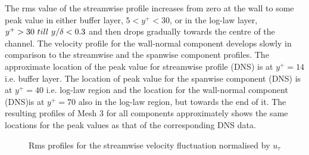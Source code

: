 The rms value of the streamwise profile increases from zero at the wall to some peak value in either buffer layer, $5<y^+< 30$, or in the log-law layer, $y^+ > 30\  till\  y/\delta <0.3$ and then drops gradually towards the centre of the channel. The velocity profile for the wall-normal component develops slowly in comparison to the streamwise and the spanwise component profiles. The approximate location of the peak value for streamwise profile (DNS) is at $y^+ = 14$ \cite{kim:moin:moser:87} i.e. buffer layer. The location of peak value for the spanwise component (DNS) is at $y^+ = 40$ i.e. log-law region and the location for the wall-normal component (DNS)is at $y^+ = 70$ also in the log-law region, but towards the end of it. The resulting profiles of Mesh 3 for all components approximately shows the same locations for the peak values as that of the corresponding DNS data.
%
\begin{figure}[h]
\begin{minipage}[b]{0.5\textwidth}
\end{minipage}
%
\begin{minipage}[b]{0.5\textwidth}
\end{minipage}
\caption{Rms profiles for the streamwise velocity fluctuation normalised by $u_\tau$}
\label{urms udns}
\end{figure}

